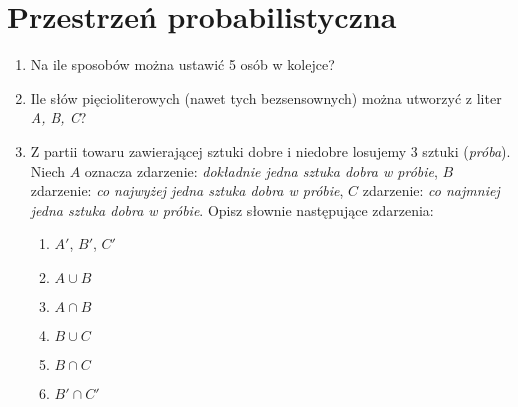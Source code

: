 \documentclass[twoside]{mwart}
\newcommand{\ans}[1]{}
\newenvironment{ansenv}{\comment}{\endcomment}
\newenvironment{ansenv}{\paragraph{Odpowiedź:}}{}
\newcommand{\ans}[1]{\begin{ansenv}#1\end{ansenv}}
\begin{document}
\section{Przestrzeń probabilistyczna}

\begin{enumerate}
\item Na ile sposobów można ustawić 5 osób w kolejce? \ans{$5!$}
\item Ile słów pięcioliterowych (nawet tych bezsensownych) można utworzyć z liter \emph{A, B, C}? \ans{$3^5=243$}
\item Z partii towaru zawierającej sztuki dobre i niedobre losujemy 3 sztuki (\emph{próba}). Niech $A$ oznacza zdarzenie: \emph{dokładnie jedna sztuka dobra w próbie}, $B$ zdarzenie: \emph{co najwyżej jedna sztuka dobra w próbie}, $C$ zdarzenie: \emph{co najmniej jedna sztuka dobra w próbie}. Opisz słownie następujące zdarzenia:
\begin{enumerate}
\item $A'$, $B'$, $C'$
\item $A\cup B$
\item $A\cap B$
\item $B\cup C$
\item $B\cap C$
\item $B'\cap C'$
\end{enumerate}
\ans{
	W próbie może być (dokładnie) 0, 1, 2 lub 3 sztuki dobre. Zatem:
	\begin{enumerate}
		\item 
		\begin{itemize}
			\item $A'$ Ze wszystkich możliwości usuwamy odpowiedź 1 sztuka dobra, uzyskując: \emph{0 lub 2 lub 3 sztuki dobre w próbie}. Uwaga, odpowiedź \emph{Dokładnie 1 sztuka zła w próbie} nie jest poprawna, bo to znaczy to samo co \emph{dokładnie 2 sztuki dobre w próbie}, a to jest tylko jedna z pozostałych możliwości.
			\item $B'$  Ze wszystkich możliwości usuwamy odpowiedzi 0 i 1 sztuk dobrych, uzyskując: \emph{2 lub 3 sztuki dobre w próbie}.
			\item $C'$  Ze wszystkich możliwości usuwamy odpowiedzi 1, 2, 3 sztuki dobre, uzyskując: \emph{0 sztuk dobrych w próbie}.

\end{itemize}
\end{enumerate}}
\end{enumerate}
\end{document}
